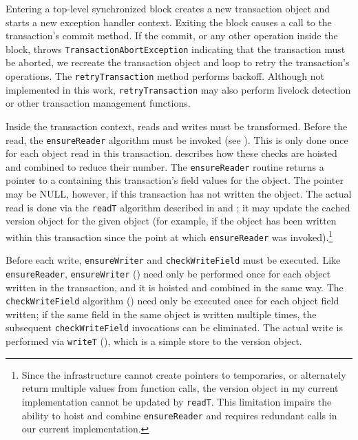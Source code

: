Entering a top-level synchronized block creates a new transaction
object and starts a new exception handler context.  Exiting the block
causes a call to the transaction's commit method.  If the commit, or
any other operation inside the block, throws
\texttt{TransactionAbortException} indicating that the transaction
must be aborted, we recreate the transaction object and loop to retry
the transaction's operations.  The \texttt{retryTransaction} method
performs backoff.  Although not implemented in this work,
\texttt{retryTransaction} 
may also perform livelock detection or other
transaction management functions.

Inside the transaction context, reads and writes must be transformed.
Before the read, the \texttt{ensureReader} algorithm
must be invoked (see ).  This
is only done once for each object read in this transaction.
 describes how these checks are hoisted and combined to
reduce their number.  The \texttt{ensureReader} routine returns a
pointer to a  containing this transaction's field
values for the object.  The pointer may be NULL, however, if this
transaction has not written the object.
The actual read is done via the \texttt{readT}
algorithm described in  and ; it may
update the cached version object for the given object (for example, if
the object has been written within this transaction since the point at
which \texttt{ensureReader} was invoked).\footnote{Since the \flex
  infrastructure cannot create pointers to temporaries, or
  alternately return multiple values from function calls, the
  version object in my current implementation cannot be updated by
  \texttt{readT}.  This limitation impairs the ability to hoist and combine
  \texttt{ensureReader} and requires redundant calls in our current
  implementation.}

Before each write, \texttt{ensureWriter} and \texttt{checkWriteField}
must be executed.  Like \texttt{ensureReader}, \texttt{ensureWriter}
() need only be performed once for each object
written in the transaction, and it is hoisted and combined in the same
way.  
The \texttt{checkWriteField} algorithm () need
only be executed once for each object field written; if the same field
in the same object is written multiple times, the subsequent
\texttt{checkWriteField} invocations can be eliminated.  The actual
write is performed via \texttt{writeT} (), which is a
simple store to the version object.

